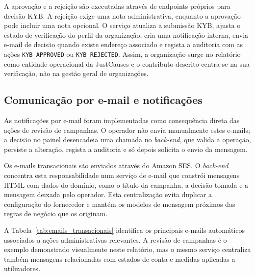 A aprovação e a rejeição são executadas através de endpoints próprios para decisão \gls{KYB}. A rejeição exige uma nota administrativa, enquanto a aprovação pode incluir uma nota opcional. O serviço atualiza a submissão \gls{KYB}, ajusta o estado de verificação do perfil da organização, cria uma notificação interna, envia e-mail de decisão quando existe endereço associado e regista a auditoria com as ações \texttt{KYB\_APPROVED} ou \texttt{KYB\_REJECTED}. Assim, a organização surge no relatório como entidade operacional da JustCauses e o contributo descrito centra-se na sua verificação, não na gestão geral de organizações.

\subsection{Comunicação por e-mail e notificações}
\label{subsec:impl_email_notifications}

As notificações por e-mail foram implementadas como consequência direta das ações de revisão de campanhas. O operador não envia manualmente estes e-mails; a decisão no painel desencadeia uma chamada no \textit{back-end}, que valida a operação, persiste a alteração, regista a auditoria e só depois solicita o envio da mensagem.

Os e-mails transacionais são enviados através do Amazon SES. O \textit{back-end} concentra esta responsabilidade num serviço de e-mail que constrói mensagens HTML com dados do domínio, como o título da campanha, a decisão tomada e a mensagem deixada pelo operador. Esta centralização evita duplicar a configuração do fornecedor e mantém os modelos de mensagem próximos das regras de negócio que os originam.

A Tabela~\ref{tab:emails_transacionais} identifica os principais e-mails automáticos associados a ações administrativas relevantes. A revisão de campanhas é o exemplo demonstrado visualmente neste relatório, mas o mesmo serviço centraliza também mensagens relacionadas com estados de conta e medidas aplicadas a utilizadores.

